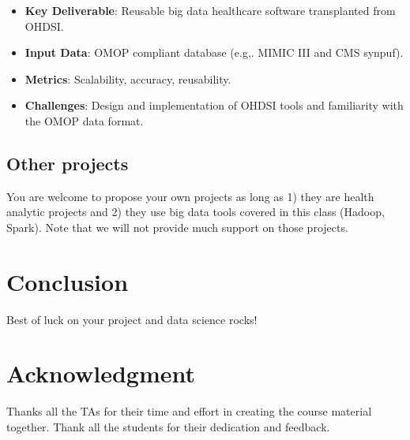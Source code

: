 \documentclass[journal]{IEEEtran}
\begin{document}
\begin{itemize}
	\item \textbf{Key Deliverable}: Reusable big data healthcare software transplanted from OHDSI.
   	\item \textbf{Input Data}: OMOP compliant database (e.g,. MIMIC III and CMS synpuf).
    \item \textbf{Metrics}: Scalability, accuracy, reusability.
    \item \textbf{Challenges}: Design and implementation of OHDSI tools and familiarity with the OMOP data format. 
\end{itemize}

\subsection{Other projects}
You are welcome to propose your own projects as long as 1) they are health analytic projects
and 2) they use big data tools covered in this class (Hadoop, Spark). Note that we will not provide much support on those projects. 

\section{Conclusion}
Best of luck on your project and data science rocks!




\section*{Acknowledgment}
Thanks all the TAs for their time and effort in creating the course material together. Thank all the students for their dedication and feedback.



\end{document}
